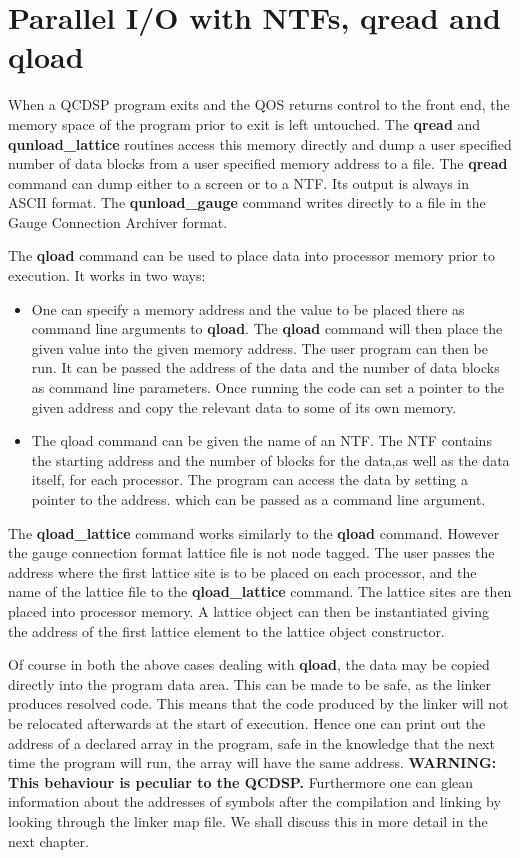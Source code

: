 \section{Parallel I/O with NTFs, qread and qload}
When a QCDSP program exits and the QOS returns control to the front end,
the memory space of the program prior to exit is left untouched. The 
{\bf qread} and {\bf qunload\_lattice} routines access this memory directly
and dump a user specified number of data blocks from a 
user specified memory address to a file. The {\bf qread} command can 
dump either to a screen or to a NTF. Its output is always in ASCII
format. The {\bf qunload\_gauge} command writes directly to a file
in the Gauge Connection Archiver format.

The {\bf qload} command can be used to place data into processor
memory prior to execution. It works in two ways:
\begin{itemize}
\item
One can specify a memory address and the value to be placed there
as command line arguments to {\bf qload}. The {\bf qload} command will
then place the given value into the given memory address. The user program
can then be run. It can be passed the address of the data and the number
of data blocks as command line parameters. Once running the code can set
a pointer to the given address and copy the relevant data to some 
of its own memory.
\item
The qload command can be given the name of an NTF. The NTF contains
the starting address and the number of blocks for the data,as well as the
data itself, for each processor.
The program can access the data by setting a pointer to the  address.
which can be passed as a command line argument.
\end{itemize}

The {\bf qload\_lattice} command works similarly to the {\bf qload}
command. However the gauge connection format lattice file is not node tagged. 
The user passes the address where the first lattice site is to be placed
on each processor, and the name of the lattice file to the {\bf qload\_lattice}
command. The lattice sites are then placed into processor memory. A 
lattice object can then be instantiated giving the address of the first
lattice element to the lattice object constructor.

Of course in both the above cases dealing with {\bf qload}, the data
may be copied directly into the program data area. This can be made to
be safe, as the linker produces resolved code. This means that the
code produced by the linker will not be relocated afterwards at the
start of execution. Hence one can print out the address of a declared
array in the program, safe in the knowledge that the next time the
program will run, the array will have the same address. {\bf WARNING:
This behaviour is peculiar to the QCDSP.} Furthermore one can glean
information about the addresses of symbols after the compilation and
linking by looking through the linker map file. We shall discuss this
in more detail in the next chapter.

